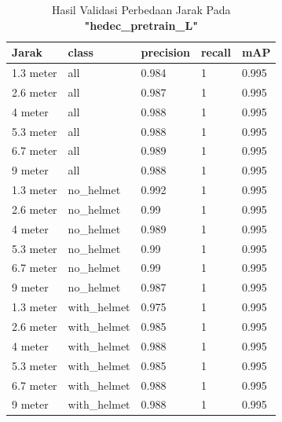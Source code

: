 \begin{enumerate}
  \begin{table}[ht]
    \centering
    \caption{Hasil Validasi Perbedaan Jarak Pada \textbf{"hedec\_pretrain\_L"}}
    \label{tb:hasiljarak_hedec_pretrain_L}
    \begin{tabular}{|l|l|l|l|l|} 
    \hline
    Jarak     & class        & precision & recall & mAP    \\ 
    \hline
    1.3 meter & all          & 0.984     & 1      & 0.995  \\
    2.6 meter & all          & 0.987     & 1      & 0.995  \\
    4 meter   & all          & 0.988     & 1      & 0.995  \\
    5.3 meter & all          & 0.988     & 1      & 0.995  \\
    6.7 meter & all          & 0.989     & 1      & 0.995  \\
    9 meter   & all          & 0.988     & 1      & 0.995  \\
    1.3 meter & no\_helmet   & 0.992     & 1      & 0.995  \\
    2.6 meter & no\_helmet   & 0.99      & 1      & 0.995  \\
    4 meter   & no\_helmet   & 0.989     & 1      & 0.995  \\
    5.3 meter & no\_helmet   & 0.99      & 1      & 0.995  \\
    6.7 meter & no\_helmet   & 0.99      & 1      & 0.995  \\
    9 meter   & no\_helmet   & 0.987     & 1      & 0.995  \\
    1.3 meter & with\_helmet & 0.975     & 1      & 0.995  \\
    2.6 meter & with\_helmet & 0.985     & 1      & 0.995  \\
    4 meter   & with\_helmet & 0.988     & 1      & 0.995  \\
    5.3 meter & with\_helmet & 0.985     & 1      & 0.995  \\
    6.7 meter & with\_helmet & 0.988     & 1      & 0.995  \\
    9 meter   & with\_helmet & 0.988     & 1      & 0.995  \\
    \hline
    \end{tabular}
  \end{table}


\end{enumerate}
